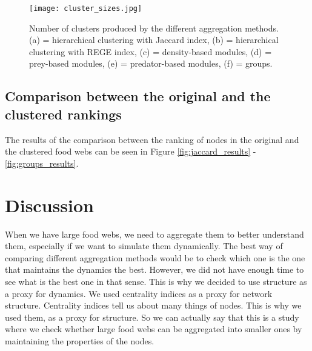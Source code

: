 \documentclass[twocolumn]{article}
\begin{document}
						\begin{figure}[htbp]%
								\centering
								\texttt{[image: cluster\_sizes.jpg]}
								\caption{Number of clusters produced by the different aggregation methods. (a) = hierarchical clustering with Jaccard index, (b) = hierarchical clustering with REGE index, (c) = density-based modules, (d) = prey-based modules, (e) = predator-based modules, (f) = groups.}
								\label{fig:cluster_sizes}
							\end{figure}

	\subsection*{Comparison between the original and the clustered rankings}

	The results of the comparison between the ranking of nodes in the original and the clustered food webs can be seen in Figure \ref{fig:jaccard_results} - \ref{fig:groups_results}.

\section*{Discussion}

	When we have large food webs, we need to aggregate them to better understand them, especially if we want to simulate them dynamically. The best way of comparing different aggregation methods would be to check which one is the one that maintains the dynamics the best. However, we did not have enough time to see what is the best one in that sense. This is why we decided to use structure as a proxy for dynamics. We used centrality indices as a proxy for network structure. Centrality indices tell us about many things of nodes. This is why we used them, as a proxy for structure. So we can actually say that this is a study where we check whether large food webs can be aggregated into smaller ones by maintaining the properties of the nodes. 
\end{document}
